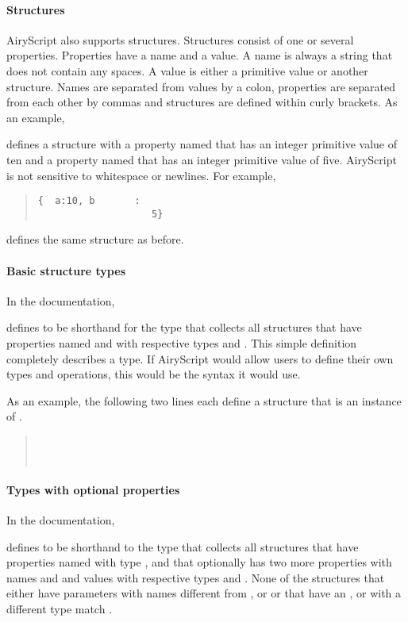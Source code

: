 \paragraph{Structures}
AiryScript also supports structures. Structures consist of one or several
properties. Properties have a name and a value. A name is always a string that
does not contain any spaces. A value is either a primitive value or another
structure. Names are separated from values by a colon, properties are separated
from each other by commas and structures are defined within curly brackets. As
an example,
\begin{quote}
\end{quote}
defines a structure with a property named  that has an integer primitive
value of ten and a property named  that has an integer primitive value of
five. AiryScript is not sensitive to whitespace or newlines. For example,
\begin{quote}
  \begin{verbatim}
{  a:10, b       :
                    5}
  \end{verbatim}
\end{quote}
defines the same structure as before.


\paragraph{Basic structure types}
In the documentation,
\begin{quote}
\end{quote}
defines  to be shorthand for the type that collects all structures that
have properties named  and  with respective types  and
. This simple definition completely describes a type. If AiryScript
would allow users to define their own types and operations, this would be the
syntax it would use.

As an example, the following two lines each define a structure that is an
instance of .
\begin{quote}
  \\
  \\
\end{quote}


\paragraph{Types with optional properties}
In the documentation,
\begin{quote}
\end{quote}
defines  to be shorthand to the type that collects all structures that
have properties named  with type , and that optionally has two
more properties with names  and  and values with respective types
 and . None of the structures that either have parameters
with names different from ,  or  or that have an ,
 or  with a different type match .

